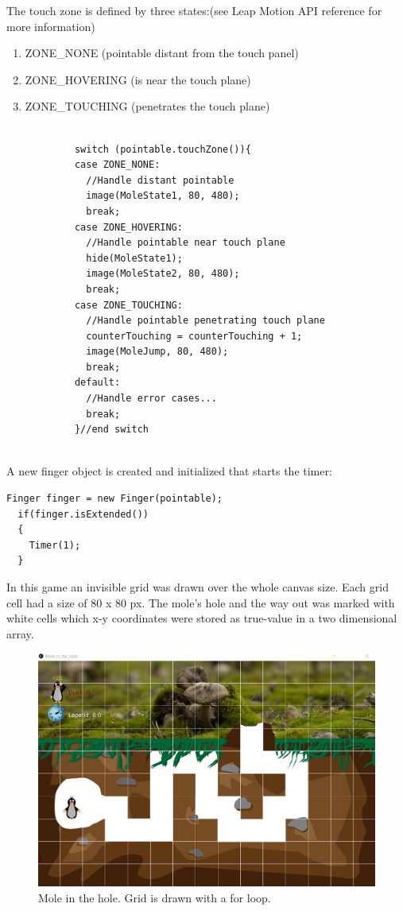 The touch zone is defined by three states:(see Leap Motion API reference for more information)
\begin{enumerate}
    \item ZONE\_NONE (pointable distant from the touch panel)
    \item ZONE\_HOVERING (is near the touch plane)
    \item ZONE\_TOUCHING (penetrates the touch plane)
\end{enumerate}




\lstset{language=Java}
\begin{lstlisting}[caption = {The code for touch zone}, label={lst:Java}]

            switch (pointable.touchZone()){
            case ZONE_NONE:
              //Handle distant pointable
              image(MoleState1, 80, 480);
              break;
            case ZONE_HOVERING:
              //Handle pointable near touch plane
              hide(MoleState1);
              image(MoleState2, 80, 480);
              break;
            case ZONE_TOUCHING:
              //Handle pointable penetrating touch plane
              counterTouching = counterTouching + 1;
              image(MoleJump, 80, 480); 
              break;
            default:
              //Handle error cases...
              break;
            }//end switch
          
\end{lstlisting}

A new finger object is created and initialized that starts the timer:

\lstset{language=Java}
\begin{lstlisting}[caption = {The code for touch zone}, label={lst:Java}]
  Finger finger = new Finger(pointable);
  if(finger.isExtended())
  {
    Timer(1);
  }
\end{lstlisting}

\break
In this game an invisible grid was drawn over the whole canvas size. Each grid cell had a size of 80 x 80 px. The mole’s hole and the way out was marked with white cells which x-y coordinates were stored as true-value in a two dimensional array.

\begin{figure}[h]  %
  \centering
  \includegraphics[width=.5\textwidth]{figures/Grid-processing-Mole_in_the_hole.png}
  \caption[Mole in the hole grid processing.]{Mole in the hole. Grid is drawn with a for loop.}
  \label{fig:grid-processing-Mole_in_the_hole}
\end{figure}

